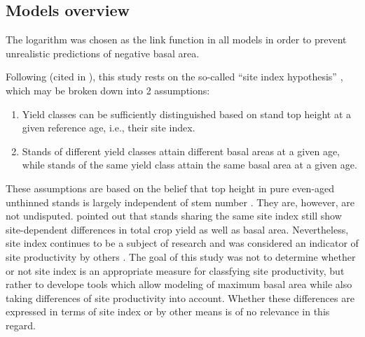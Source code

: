 \subsection{Models overview}

The logarithm was chosen as the link function in all models in order to prevent unrealistic predictions of negative basal area.

Following \textcite{Baur1881} (cited in \textcite[p. 159]{Assmann1970}), this study rests on the so-called “site index hypothesis” \parencite{Skovsgaard2008}, which may be broken down into 2 assumptions:
\begin{enumerate}
\item Yield classes can be sufficiently distinguished based on stand top height at a given reference age, i.e., their site index.
\item Stands of different yield classes attain different basal areas at a given age, while stands of the same yield class attain the same basal area at a given age.
\end{enumerate}
These assumptions are based on the belief that top height in pure even-aged unthinned stands is largely independent of stem number \parencite{Skovsgaard2008}.  
They are, however, are not undisputed.  \textcite{Assmann1970} pointed out that stands sharing the same site index still show site-dependent differences in total crop yield as well as basal area.  Nevertheless, site index continues to be a subject of research \parencite{Weiskittel2011,Somarriba2001,Wang2005} and was considered an indicator of site productivity by others \parencite{Monserud1984,Rayner1992,Karlsson1997}.  The goal of this study was not to determine whether or not site index is an appropriate measure for classfying site productivity, but rather to develope tools which allow modeling of maximum basal area while also taking differences of site productivity into account.  Whether these differences are expressed in terms of site index or by other means is of no relevance in this regard.



